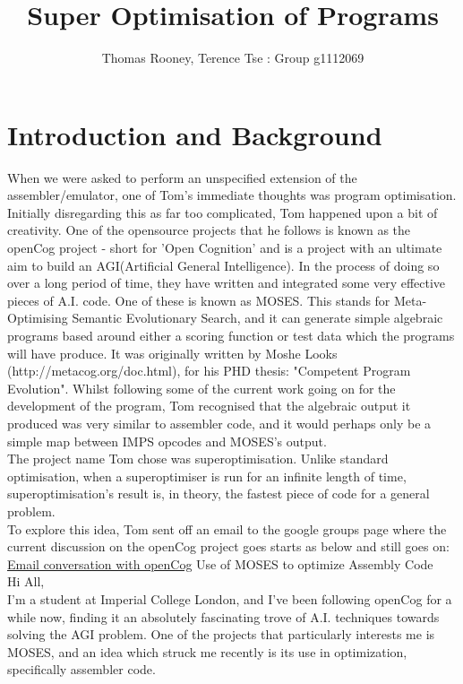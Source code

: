 \documentclass[11pt]{article}
\begin{document}
\title{Super Optimisation of Programs}
\author{Thomas Rooney, Terence Tse : Group g1112069}
\maketitle

\section{Introduction and Background}
\indent When we were asked to perform an unspecified extension of the assembler/emulator, one of Tom's immediate thoughts was program optimisation. Initially disregarding this as far too complicated, Tom happened upon a bit of creativity. One of the opensource projects that he follows is known as the openCog project - short for 'Open Cognition' and is a project with an ultimate aim to build an AGI(Artificial General Intelligence). In the process of doing so over a long period of time, they have written and integrated some very effective pieces of A.I. code. 
One of these is known as MOSES. This stands for Meta-Optimising Semantic Evolutionary Search, and it can generate simple algebraic programs based around either a scoring function or test data which the programs will have produce. It was originally written by Moshe Looks (http://metacog.org/doc.html), for his PHD thesis: "Competent Program Evolution". Whilst following some of the current work going on for the development of the program, Tom recognised that the algebraic output it produced was very similar to assembler code, and it would perhaps only be a simple map between IMPS opcodes and MOSES's output. 
\\
\indent The project name Tom chose was superoptimisation. Unlike standard optimisation, when a superoptimiser is run for an infinite length of time, superoptimisation's result is, in theory, the fastest piece of code for a general problem.
\\
\indent To explore this idea, Tom sent off an email to the google groups page where the current discussion on the openCog project goes starts as below and still goes on:
\\
\noindent\underline{Email conversation with openCog}
Use of MOSES to optimize Assembly Code
\\
Hi All,
\\
I'm a student at Imperial College London, and I've been following
openCog for a while now, finding it an absolutely fascinating trove of A.I. techniques towards solving the AGI problem. One of the projects that particularly interests me is MOSES, and an idea which struck me recently is its use in optimization, specifically assembler code. 
\end{document}

